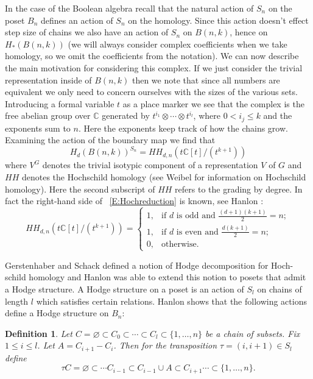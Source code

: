 \documentclass{amsart}
\newtheorem{definition}[theorem]{Definition}
\newcommand{\C}{\mathbb{C}}
\newcommand{\full}{\{1, \ldots, n\}}
\begin{document}
In the case of the Boolean algebra recall that
the natural action of $S_n$ on the poset $B_n$ defines an action of $S_n$ on the homology. Since this action doesn't 
effect step size of chains we also have an action of $S_n$ on $B(n, k)$, hence on $H_*(B(n, k))$ (we will always consider
complex coefficients when we take homology, so we omit the coefficients from the notation). We can now describe the
main motivation for considering this complex. If we just consider the trivial representation inside of $B(n, k)$ then we
note that since all numbers are equivalent we only need to concern ourselves with the sizes of the various sets. 
Introducing a formal variable $t$ as a place marker we see that the complex is the free abelian group over $\C$ generated
by $t^{i_1}\otimes \cdots \otimes t^{i_l}$, where $0 <i_j \le k$ and the exponents sum to $n$.
 Here the exponents keep track of how the chains grow. Examining the action of the boundary map we find that
\begin{equation} \label{E:Hochreduction}
  H_d(B(n, k))^{S_n} = HH_{d, n}(t\C[t]/(t^{k+1}))
\end{equation}
where $V^G$  denotes the trivial isotypic component of a representation $V$ of $G$ and $HH$ denotes the Hochschild 
homology (see Weibel \cite{Weibel} for information on Hochschild homology). Here the second 
subscript of $HH$ refers to the grading by degree. In fact the right-hand side of ~\ref{E:Hochreduction} is known, see 
Hanlon \cite{HanlonMac}:
\begin{equation} \label{E:HH}
  HH_{d, n}(t\C[t]/(t^{k+1})) = 
  \begin{cases} 
   1, &\text{if $d$ is odd and $\frac{(d+1)(k+1)}{2} = n;$}\\
   1, &\text{if $d$ is even and $\frac{d(k+1)}{2} = n;$}\\
   0, &\text{otherwise.}
  \end{cases}
\end{equation}

Gerstenhaber and Schack \cite{GS} defined a notion of Hodge decomposition for Hoch-schild homology and Hanlon \cite{Hanlon}
was able to extend this notion to posets that admit a Hodge structure. A Hodge structure on a poset is an action of
$S_l$ on chains of length $l$ which satisfies certain 
relations. Hanlon shows that the following actions define a Hodge structure on $B_n$:
\begin{definition}
  Let $C =\varnothing \subset C_0 \subset \cdots \subset C_l \subset \full$ be a chain of subsets. Fix $1 \le i \le l$. 
  Let $A = C_{i+1} - C_i$. Then for the transposition $\tau = 
  (i, i+1) \in S_l$ define $$\tau C = \varnothing \subset \cdots C_{i-1} \subset C_{i-1} \cup A \subset C_{i+1} \cdots 
  \subset \full.$$
\end{definition}
\end{document}
